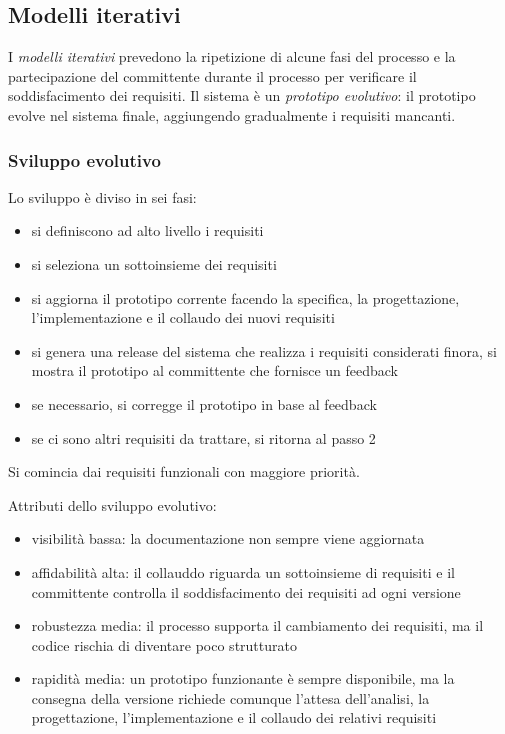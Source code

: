\documentclass[11pt]{article}
\begin{document}
\subsection{Modelli iterativi}
I \textit{modelli iterativi} prevedono la ripetizione di alcune fasi del processo e la partecipazione del committente
durante il processo per verificare il soddisfacimento dei requisiti. Il sistema è un \textit{prototipo evolutivo}: il 
prototipo evolve nel sistema finale, aggiungendo gradualmente i requisiti mancanti. 
\subsubsection*{Sviluppo evolutivo}
Lo sviluppo è diviso  in sei fasi:
\begin{itemize}
    \item si definiscono ad alto livello i requisiti
    \item si seleziona un sottoinsieme dei requisiti
    \item si aggiorna il prototipo corrente facendo la specifica, la progettazione, l'implementazione e il collaudo dei 
    nuovi requisiti
    \item si genera una release del sistema che realizza i requisiti considerati finora, si mostra il prototipo al committente 
    che fornisce un feedback
    \item se necessario, si corregge il prototipo in base al feedback 
    \item se ci sono altri requisiti da trattare, si ritorna al passo 2
\end{itemize}
Si comincia dai requisiti funzionali con maggiore priorità.

Attributi dello sviluppo evolutivo:
\begin{itemize}
    \item visibilità bassa: la documentazione non sempre viene aggiornata
    \item affidabilità alta: il collauddo riguarda un sottoinsieme di requisiti e il committente controlla il soddisfacimento 
    dei requisiti ad ogni versione 
    \item robustezza media: il processo supporta il cambiamento dei requisiti, ma il codice rischia di diventare poco 
    strutturato
    \item rapidità media: un prototipo funzionante è sempre disponibile, ma la consegna della versione richiede comunque 
    l'attesa dell'analisi, la progettazione, l'implementazione e il collaudo dei relativi requisiti
\end{itemize}
\end{document}
